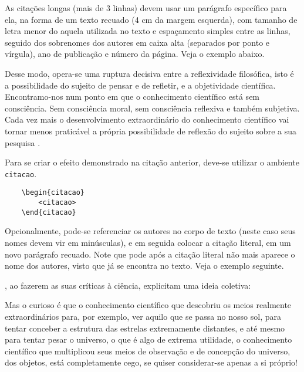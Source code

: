 As citações longas (mais de 3 linhas) devem usar um parágrafo específico para ela, na forma de um texto recuado (4 cm da margem esquerda), com tamanho de letra menor do aquela utilizada no texto e espaçamento simples entre as linhas, seguido dos sobrenomes dos autores em caixa alta (separados por ponto e vírgula), ano de publicação e número da página.
Veja o exemplo abaixo.

\begin{citacao}
Desse modo, opera-se uma ruptura decisiva entre a reflexividade filosófica, isto é a possibilidade do sujeito de pensar e de refletir, e a objetividade científica.
Encontramo-nos num ponto em que o conhecimento científico está sem consciência.
Sem consciência moral, sem consciência reflexiva e também subjetiva.
Cada vez mais o desenvolvimento extraordinário do conhecimento científico vai tornar menos praticável a própria possibilidade de reflexão do sujeito sobre a sua pesquisa \cite[p.~28]{morinmoigne:2000}.
\end{citacao}

Para se criar o efeito demonstrado na citação anterior, deve-se utilizar o ambiente \texttt{citacao}.
\begin{verbatim}
    \begin{citacao}
        <citacao>
    \end{citacao}
\end{verbatim}

Opcionalmente, pode-se referenciar os autores no corpo de texto (neste caso seus nomes devem vir em minúsculas), e em seguida colocar a citação literal, em um novo parágrafo recuado.
Note que pode após a citação literal não mais aparece o nome dos autores, visto que já se encontra no texto.
Veja o exemplo seguinte.

, ao fazerem as suas críticas à ciência, explicitam uma ideia coletiva:

\begin{citacao}
Mas o curioso é que o conhecimento científico que descobriu os meios realmente extraordinários para, por exemplo, ver aquilo que se passa no nosso sol, para tentar conceber a estrutura das estrelas extremamente distantes, e até mesmo para tentar pesar o universo, o que é algo de extrema utilidade, o conhecimento científico que multiplicou seus meios de observação e de concepção do universo, dos objetos, está completamente cego, se quiser considerar-se apenas a si próprio!
\end{citacao}

